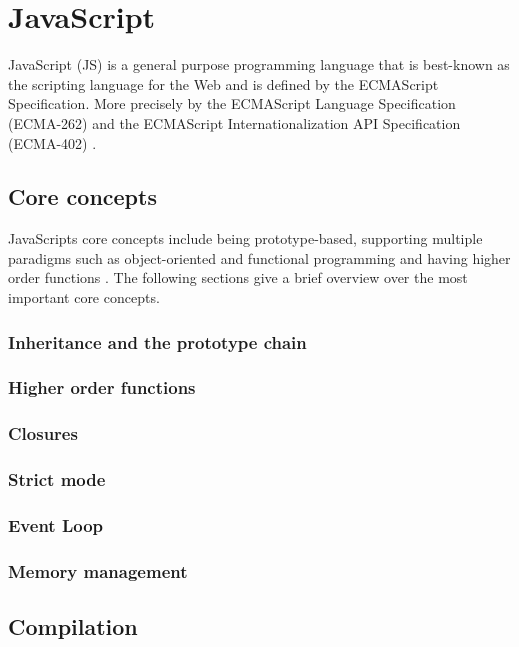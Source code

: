 \clearpage

\chapter{\textbf{JavaScript}}\label{javascript}

JavaScript (JS) is a general purpose programming language that is best-known as the scripting language for the Web and is defined by the ECMAScript Specification.
More precisely by the ECMAScript Language Specification (ECMA-262) and the ECMAScript Internationalization API Specification (ECMA-402) \cite{mdn-js}.

\section{Core concepts}\label{js:core-concepts}
JavaScripts core concepts include being prototype-based, supporting multiple paradigms such as object-oriented and functional programming and having higher order functions \cite{mdn-js}. The following sections give a brief overview over the most important core concepts.

\subsection{Inheritance and the prototype chain}




\subsection{Higher order functions}
\subsection{Closures}
\subsection{Strict mode}
\subsection{Event Loop}
\subsection{Memory management}

\section{Compilation}


